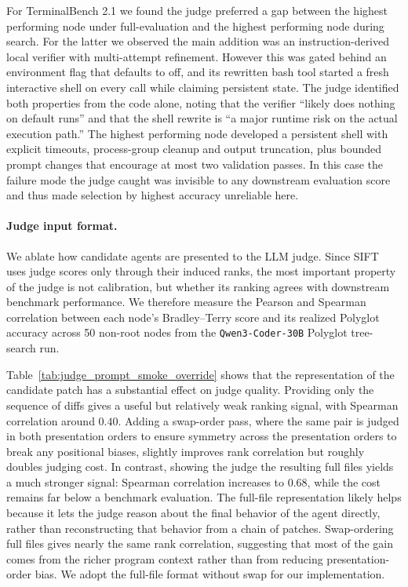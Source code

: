 \documentclass{article}
\begin{document}
For TerminalBench 2.1 we found the judge preferred a gap between the highest performing node under full-evaluation and the highest performing node during search. For the latter we observed the main addition was an instruction-derived local verifier with multi-attempt refinement. However this was gated behind an environment flag that defaults to off, and its rewritten bash tool started a fresh interactive shell on every call while claiming persistent state. The judge identified both properties from the code alone, noting that the verifier ``likely does nothing on default runs'' and that the shell rewrite is ``a major runtime risk on the actual execution path.'' The highest performing node developed a persistent shell with explicit timeouts, process-group cleanup and output truncation, plus bounded prompt changes that encourage at most two validation passes. In this case the failure mode the judge caught was invisible to any downstream evaluation score and thus made selection by highest accuracy unreliable here.

\paragraph{Judge input format.}
We ablate how candidate agents are presented to the LLM judge. Since SIFT uses judge scores only through their induced ranks, the most important property of the judge is not calibration, but whether its ranking agrees with downstream benchmark performance. We therefore measure the Pearson and Spearman correlation between each node's Bradley--Terry score and its realized Polyglot accuracy across 50 non-root nodes from the \texttt{Qwen3-Coder-30B} Polyglot tree-search run.

Table~\ref{tab:judge_prompt_smoke_override} shows that the representation of the candidate patch has a substantial effect on judge quality. Providing only the sequence of diffs gives a useful but relatively weak ranking signal, with Spearman correlation around $0.40$. Adding a swap-order pass, where the same pair is judged in both presentation orders to ensure symmetry across the presentation orders to break any positional biases, slightly improves rank correlation but roughly doubles judging cost. In contrast, showing the judge the resulting full files yields a much stronger signal: Spearman correlation increases to $0.68$, while the cost remains far below a benchmark evaluation. The full-file representation likely helps because it lets the judge reason about the final behavior of the agent directly, rather than reconstructing that behavior from a chain of patches. Swap-ordering full files gives nearly the same rank correlation, suggesting that most of the gain comes from the richer program context rather than from reducing presentation-order bias. We adopt the full-file format without swap for our implementation.
\end{document}
